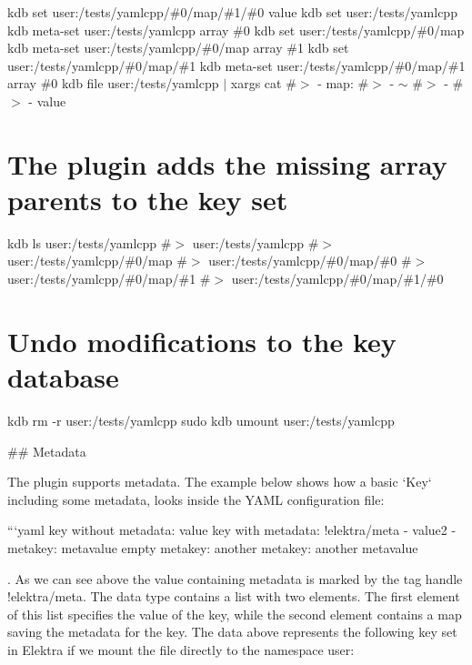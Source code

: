 kdb set user\+:/tests/yamlcpp/\#0/map/\#1/\#0 value kdb set user\+:/tests/yamlcpp kdb meta-\/set user\+:/tests/yamlcpp array \textquotesingle{}\#0\textquotesingle{} kdb set user\+:/tests/yamlcpp/\#0/map kdb meta-\/set user\+:/tests/yamlcpp/\#0/map array \textquotesingle{}\#1\textquotesingle{} kdb set user\+:/tests/yamlcpp/\#0/map/\#1 kdb meta-\/set user\+:/tests/yamlcpp/\#0/map/\#1 array \textquotesingle{}\#0\textquotesingle{} kdb file user\+:/tests/yamlcpp $\vert$ xargs cat \#$>$ -\/ map\+: \#$>$ -\/ $\sim$ \#$>$ -\/ \#$>$ -\/ value\hypertarget{autotoc_md817_autotoc_md860}{}\section{The plugin adds the missing array parents to the key set}\label{autotoc_md817_autotoc_md860}
kdb ls user\+:/tests/yamlcpp \#$>$ user\+:/tests/yamlcpp \#$>$ user\+:/tests/yamlcpp/\#0/map \#$>$ user\+:/tests/yamlcpp/\#0/map/\#0 \#$>$ user\+:/tests/yamlcpp/\#0/map/\#1 \#$>$ user\+:/tests/yamlcpp/\#0/map/\#1/\#0\hypertarget{autotoc_md817_autotoc_md861}{}\section{Undo modifications to the key database}\label{autotoc_md817_autotoc_md861}
kdb rm -\/r user\+:/tests/yamlcpp sudo kdb umount user\+:/tests/yamlcpp 
\begin{DoxyCode}
## Metadata

The plugin supports metadata. The example below shows how a basic `Key` including some metadata, looks
       inside the YAML configuration file:

```yaml
key without metadata: value
key with metadata: !elektra/meta
  - value2
  - metakey: metavalue
    empty metakey:
    another metakey: another metavalue
\end{DoxyCode}


. As we can see above the value containing metadata is marked by the tag handle {\ttfamily !elektra/meta}. The data type contains a list with two elements. The first element of this list specifies the value of the key, while the second element contains a map saving the metadata for the key. The data above represents the following key set in Elektra if we mount the file directly to the namespace {\ttfamily user}\+:

